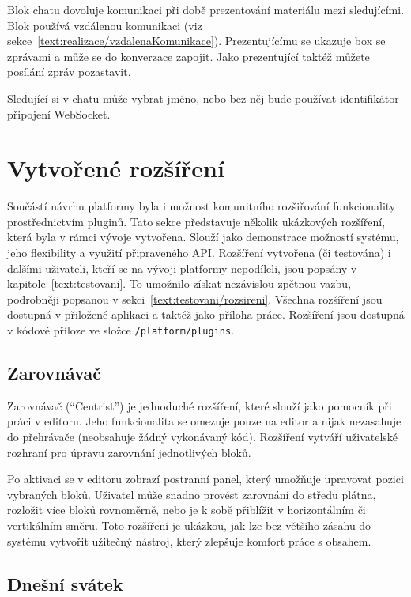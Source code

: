Blok chatu dovoluje komunikaci při době prezentování materiálu mezi sledujícími.
Blok používá vzdálenou komunikaci (viz sekce~\ref{text:realizace/vzdalenaKomunikace}).
Prezentujícímu se ukazuje box se zprávami a může se do konverzace zapojit.
Jako prezentující taktéž můžete posílání zpráv pozastavit.

Sledující si v chatu může vybrat jméno, nebo bez něj bude používat identifikátor připojení WebSocket.

\section{Vytvořené rozšíření}\label{text:realizace/vytvoreneRozsireni}

Součástí návrhu platformy byla i možnost komunitního rozšiřování funkcionality prostřednictvím pluginů. 
Tato sekce představuje několik ukázkových rozšíření, která byla v rámci vývoje vytvořena. 
Slouží jako demonstrace možností systému, jeho flexibility a využití připraveného API. 
Rozšíření vytvořena (či testována) i dalšími uživateli, kteří se na vývoji platformy nepodíleli, jsou popsány v kapitole~\ref{text:testovani}.
To umožnilo získat nezávislou zpětnou vazbu, podrobněji popsanou v sekci~\ref{text:testovani/rozsireni}. 
Všechna rozšíření jsou dostupná v přiložené aplikaci a taktéž jako příloha práce.
Rozšíření jsou dostupná v kódové příloze ve složce \verb|/platform/plugins|.

\subsection{Zarovnávač}

Zarovnávač (\enquote{Centrist}) je jednoduché rozšíření, které slouží jako pomocník při práci v editoru.
Jeho funkcionalita se omezuje pouze na editor a nijak nezasahuje do přehrávače (neobsahuje žádný vykonávaný kód).
Rozšíření vytváří uživatelské rozhraní pro úpravu zarovnání jednotlivých bloků.

Po aktivaci se v editoru zobrazí postranní panel, který umožňuje upravovat pozici vybraných bloků. 
Uživatel může snadno provést zarovnání do středu plátna, rozložit více bloků rovnoměrně, nebo je k sobě přiblížit v horizontálním či vertikálním směru. 
Toto rozšíření je ukázkou, jak lze bez většího zásahu do systému vytvořit užitečný nástroj, který zlepšuje komfort práce s obsahem.

\subsection{Dnešní svátek}

